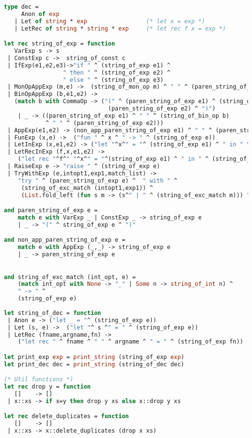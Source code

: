 \begin{lstlisting}[language=Caml, caption=definitions.ml]
type dec =
     Anon of exp
   | Let of string * exp                 (* let x = exp *)
   | LetRec of string * string * exp     (* let rec f x = exp *)

let rec string_of_exp = function
   VarExp s -> s
 | ConstExp c ->  string_of_const c
 | IfExp(e1,e2,e3)->"if " ^ (string_of_exp e1) ^
                 " then " ^ (string_of_exp e2) ^
                 " else " ^ (string_of_exp e3)
 | MonOpAppExp (m,e) ->  (string_of_mon_op m) ^ " " ^ (paren_string_of_exp e) 
 | BinOpAppExp (b,e1,e2) -> 
   (match b with CommaOp -> ("(" ^ (paren_string_of_exp e1) ^ (string_of_bin_op b) ^
                              (paren_string_of_exp e2) ^ ")")
    | _ -> ((paren_string_of_exp e1) ^ " " ^ (string_of_bin_op b)
            ^ " " ^ (paren_string_of_exp e2)))
 | AppExp(e1,e2) -> (non_app_paren_string_of_exp e1) ^ " " ^ (paren_string_of_exp e2) 
 | FunExp (x,e) ->  ("fun " ^ x ^ " -> " ^ (string_of_exp e))
 | LetInExp (x,e1,e2) -> ("let "^x^" = "^ (string_of_exp e1) ^ " in " ^ (string_of_exp e2))
 | LetRecInExp (f,x,e1,e2) -> 
    ("let rec "^f^" "^x^" = "^(string_of_exp e1) ^ " in " ^ (string_of_exp e2))
 | RaiseExp e -> "raise " ^ (string_of_exp e)
 | TryWithExp (e,intopt1,exp1,match_list) ->
    "try " ^ (paren_string_of_exp e) ^  " with " ^
     (string_of_exc_match (intopt1,exp1)) ^
     (List.fold_left (fun s m -> (s^" | " ^ (string_of_exc_match m))) "" match_list) 

and paren_string_of_exp e =
    match e with VarExp _ | ConstExp _ -> string_of_exp e
    | _ -> "(" ^ string_of_exp e ^ ")"

and non_app_paren_string_of_exp e =
    match e with AppExp (_,_) -> string_of_exp e
    | _ -> paren_string_of_exp e
 

and string_of_exc_match (int_opt, e) =
    (match int_opt with None -> "_" | Some n -> string_of_int n) ^
    " -> " ^
    (string_of_exp e)
							
let string_of_dec = function
 | Anon e -> ("let _ = "^ (string_of_exp e))
 | Let (s, e) ->  ("let "^ s ^" = " ^ (string_of_exp e))
 | LetRec (fname,argname,fn) -> 
    ("let rec " ^ fname ^ " " ^ argname ^ " = " ^ (string_of_exp fn))

let print_exp exp = print_string (string_of_exp exp) 
let print_dec dec = print_string (string_of_dec dec)

(* Util functions *)
let rec drop y = function
   []    -> []
 | x::xs -> if x=y then drop y xs else x::drop y xs

let rec delete_duplicates = function
   []    -> []
 | x::xs -> x::delete_duplicates (drop x xs)


\end{lstlisting}
